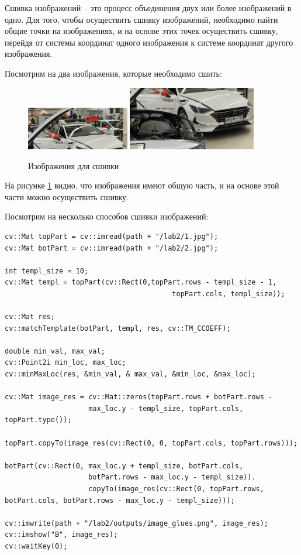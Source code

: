 Сшивка изображений -- это процесс объединения двух или более изображений в одно.
Для того, чтобы осуществить сшивку изображений, необходимо найти общие точки на изображениях, и на основе этих точек осуществить сшивку, 
перейдя от системы координат одного изображения к системе координат другого изображения.

Посмотрим на два изображения, которые необходимо сшить:

\begin{figure}[ht]
    \centering
    \includegraphics[width=0.4\textwidth]{../source/top.png}
    \includegraphics[width=0.5\textwidth]{../source/bttm.png}
    \caption{Изображения для сшивки}
    \label{fig:stitch_images}
\end{figure}

На рисунке \ref{fig:stitch_images} видно, что изображения имеют общую часть, и на основе этой части можно осуществить сшивку.

Посмотрим на несколько способов сшивки изображений:

\begin{lstlisting}[style=cpp_white, caption={Исходный код для сшивки изображений}]
cv::Mat topPart = cv::imread(path + "/lab2/1.jpg");
cv::Mat botPart = cv::imread(path + "/lab2/2.jpg");

int templ_size = 10;
cv::Mat templ = topPart(cv::Rect(0,topPart.rows - templ_size - 1, 
                                        topPart.cols, templ_size));

cv::Mat res;
cv::matchTemplate(botPart, templ, res, cv::TM_CCOEFF);

double min_val, max_val;
cv::Point2i min_loc, max_loc;
cv::minMaxLoc(res, &min_val, & max_val, &min_loc, &max_loc);

cv::Mat image_res = cv::Mat::zeros(topPart.rows + botPart.rows - 
                    max_loc.y - templ_size, topPart.cols, topPart.type());

topPart.copyTo(image_res(cv::Rect(0, 0, topPart.cols, topPart.rows)));

botPart(cv::Rect(0, max_loc.y + templ_size, botPart.cols,
                    botPart.rows - max_loc.y - templ_size)).
                    copyTo(image_res(cv::Rect(0, topPart.rows, botPart.cols, botPart.rows - max_loc.y - templ_size)));

cv::imwrite(path + "/lab2/outputs/image_glues.png", image_res);
cv::imshow("B", image_res);
cv::waitKey(0);
\end{lstlisting}

